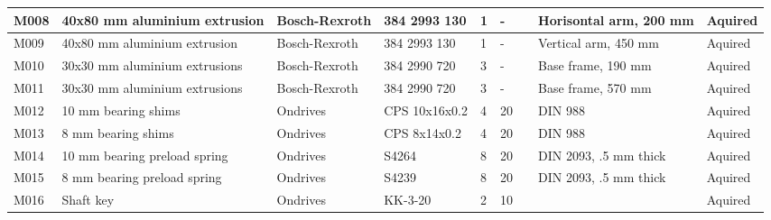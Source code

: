 \begin{longtable}{|m{}|m{}|m{}|m{}|m{}|m{}|m{}|m{}|m{}|}
M008        & 40x80 mm aluminium extrusion        & Bosch-Rexroth     & 384 2993 130              & 1            & -                            &                            & Horisontal arm, 200 mm                                   & Aquired         \\ \hline
M009        & 40x80 mm aluminium extrusion        & Bosch-Rexroth     & 384 2993 130              & 1            & -                            &                            & Vertical arm, 450 mm                                     & Aquired         \\ \hline
M010        & 30x30 mm aluminium extrusions       & Bosch-Rexroth     & 384 2990 720              & 3            & -                            &                            & Base frame, 190 mm                                       & Aquired         \\ \hline
M011        & 30x30 mm aluminium extrusions       & Bosch-Rexroth     & 384 2990 720              & 3            & -                            &                            & Base frame, 570 mm                                       & Aquired         \\ \hline
M012        & 10 mm bearing shims                 & Ondrives          & CPS 10x16x0.2            & 4            & 20                           &                            & DIN 988                                                  & Aquired         \\ \hline
M013        & 8 mm bearing shims                  & Ondrives          & CPS 8x14x0.2             & 4            & 20                           &                            & DIN 988                                                  & Aquired         \\ \hline
M014        & 10 mm bearing preload spring        & Ondrives          & S4264                   & 8            & 20                           &                            & DIN 2093, .5 mm thick                                    & Aquired         \\ \hline
M015        & 8 mm bearing preload spring         & Ondrives          & S4239                   & 8            & 20                           &                            & DIN 2093, .5 mm thick                                    & Aquired         \\ \hline
M016        & Shaft key                           & Ondrives          & KK-3-20                 & 2            & 10                           &                            &                                                          & Aquired         \\ \hline

\end{longtable}
